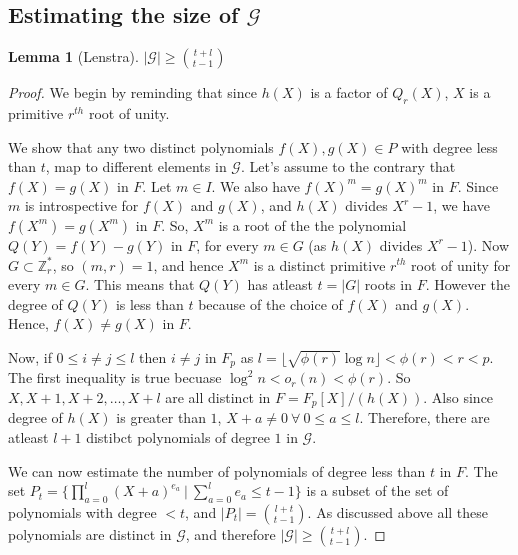 \documentclass[11pt]{article}
\newtheorem{lemma}[theorem]{Lemma}
\begin{document}
\subsection{Estimating the size of $\mathcal{G}$}
\begin{lemma}
[Lenstra]\label{lemma:GLowerBound}
$|\mathcal{G}| \geq {{t+l} \choose {t-1}}$
\end{lemma}
\begin{proof}
We begin by reminding that since $h(X)$ is a factor of $Q_r(X)$, $X$ is a primitive $r^{th}$ root of unity.

We show that any two distinct polynomials $f(X), g(X) \in P$ with degree less than $t$, map to different elements in $\mathcal{G}$. Let's assume to the contrary that $f(X) = g(X)$ in $F$. Let $m \in I$. We also have $f(X)^m = g(X)^m$ in $F$. Since $m$ is introspective for $f(X)$ and $g(X)$, and $h(X)$ divides $X^r-1$, we have $f(X^m) = g(X^m)$ in $F$. So, $X^m$ is a root of the the polynomial $Q(Y) = f(Y) - g(Y)$ in $F$, for every $m \in G$ (as $h(X)$ divides $X^r-1$). Now $G \subset \mathbb{Z}_r^*$, so $(m,r) = 1$, and hence $X^m$ is a distinct primitive $r^{th}$ root of unity for every $m \in G$. This means that $Q(Y)$ has atleast $t = |G|$ roots in $F$. However the degree of $Q(Y)$ is less than $t$ because of the choice of $f(X)$ and $g(X)$. Hence, $f(X) \neq g(X)$ in $F$.

Now, if $0 \leq i \neq j \leq l$ then $i \neq j$ in $F_p$ as $l = \lfloor \sqrt{\phi(r)} \log n\rfloor < \phi(r) < r < p$. The first inequality is true becuase $\log^2{n} < o_r(n) < \phi(r)$. So $X, X+1, X+2, \dots, X+l$ are all distinct in $F = F_p[X]/(h(X))$. Also since degree of $h(X)$ is greater than $1$, $X+a \neq 0\ \forall \ 0 \leq a \leq l$. Therefore, there are atleast $l+1$ distibct polynomials of degree $1$ in $\mathcal{G}$.

We can now estimate the number of polynomials of degree less than $t$ in $F$. The set $P_t = \{\prod_{a=0}^{l}(X+a)^{e_a}\ | \ \sum_{a=0}^{l}e_a \leq t-1\}$ is a subset of the set of polynomials with degree $<t$, and $|P_t| = {{l+t}\choose{t-1}}$. As discussed above all these polynomials are distinct in $\mathcal{G}$, and therefore $|\mathcal{G}| \geq {{t+l} \choose {t-1}}$.
\end{proof}
\end{document}
